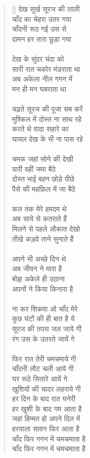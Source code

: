 \begin{verse}[\versewidth]\texthindi{
देख सुर्ख सूरज की लाली\\
चाँद का चेहरा उतर गया\\
चाँदनी रूठ गई उस से\\
दामन हर तारा छुड़ा गया\\
\\
देख के सुंदर चंदा को\\
सारी रात चकोर मंडराता था\\
अब अकेला नील गगन में\\
मन ही मन घबराता था\\
\\
चढ़ते सूरज की पूजा सब करें\\
मुश्किल में दोस्त ना साथ रहे\\
करते थे वादा सहारे का\\
घायल देख के भी ना पास रहे\\
\\
चमक जहां सोने की देखी\\
यारी वहीं जमा बैठे\\
दोस्त भाई बहन छोड़े पीछे\\
पैसे की महफ़िल में जा बैठे\\
\\
कल तक मेरे हमदम थे\\
अब साये से कतराते हैं\\
मिलने से पहले औकात देखो\\
तीखे कड़वे ताने सुनाते हैं\\
\\
अपने भी अच्छे दिन थे\\
अब जीवन ने मारा है\\
बोझ अकेले ही उठाना\\
अपनों ने किया किनारा है\\
\\
ना कर शिकवा ओ चाँद मेरे\\
कुछ घंटों की ही बात है ये\\
सूरज की तपस जल जाये गी\\
रंग उस के उतरते जायें गे\\
\\
फिर रात तेरी चमचमाये गी\\
चाँदनी लौट चली आये गी\\
घर रूठे सितारे आयें गे\\
खुशियों की चादर लहराये गी\\
हर दिन के बाद रात घनेरी\\
हर खुशी के बाद गम आता है\\
जहां हिम्मत हो अपने दिल में\\
हरयाला सावन फिर आता है\\
चाँद फिर गगन में चमचमाता है\\
चाँद फिर गगन में चमचमाता है
}\end{verse}

